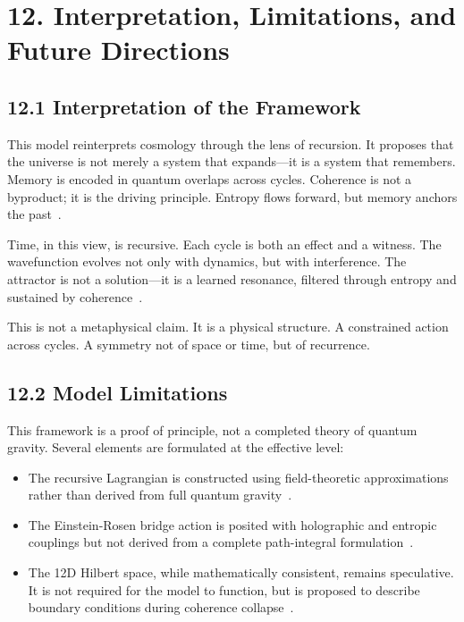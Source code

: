 \section*{12. Interpretation, Limitations, and Future Directions}

\subsection*{12.1 Interpretation of the Framework}

This model reinterprets cosmology through the lens of recursion. It proposes that the universe is not merely a system that expands---it is a system that remembers. Memory is encoded in quantum overlaps across cycles. Coherence is not a byproduct; it is the driving principle. Entropy flows forward, but memory anchors the past~\cite{zurek2003decoherence}.

Time, in this view, is recursive. Each cycle is both an effect and a witness. The wavefunction evolves not only with dynamics, but with interference. The attractor is not a solution---it is a learned resonance, filtered through entropy and sustained by coherence~\cite{gellmann1994complex, hartle1983wave}.

This is not a metaphysical claim. It is a physical structure. A constrained action across cycles. A symmetry not of space or time, but of recurrence.

\subsection*{12.2 Model Limitations}

This framework is a proof of principle, not a completed theory of quantum gravity. Several elements are formulated at the effective level:

\begin{itemize}
  \item The recursive Lagrangian is constructed using field-theoretic approximations rather than derived from full quantum gravity~\cite{rovelli2004quantum}.
  \item The Einstein-Rosen bridge action is posited with holographic and entropic couplings but not derived from a complete path-integral formulation~\cite{maldacena2013cool, vanraamsdonk2010entanglementgeometry}.
  \item The 12D Hilbert space, while mathematically consistent, remains speculative. It is not required for the model to function, but is proposed to describe boundary conditions during coherence collapse~\cite{tegmark2008mathematical}.
\end{itemize}

